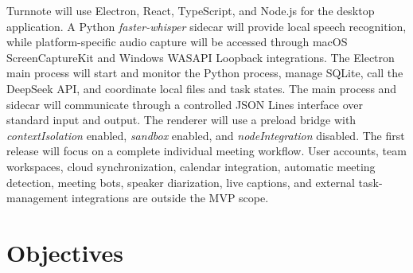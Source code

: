 \documentclass[12pt,a4paper]{article}
\begin{document}
Turnnote will use Electron, React, TypeScript, and Node.js for the desktop application. A Python \textit{faster-whisper} sidecar will provide local speech recognition, while platform-specific audio capture will be accessed through macOS ScreenCaptureKit and Windows WASAPI Loopback integrations. The Electron main process will start and monitor the Python process, manage SQLite, call the DeepSeek API, and coordinate local files and task states. The main process and sidecar will communicate through a controlled JSON Lines interface over standard input and output. The renderer will use a preload bridge with \textit{contextIsolation} enabled, \textit{sandbox} enabled, and \textit{nodeIntegration} disabled. The first release will focus on a complete individual meeting workflow. User accounts, team workspaces, cloud synchronization, calendar integration, automatic meeting detection, meeting bots, speaker diarization, live captions, and external task-management integrations are outside the MVP scope.\par
{}
\section*{Objectives}
\end{document}
